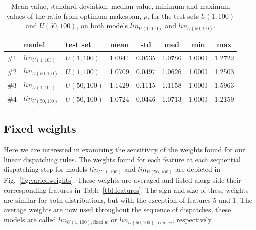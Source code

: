 \documentclass[10pt]{llncs}
\begin{document}
\begin{table}[t!]
 {\footnotesize
 \begin{center}
  \begin{tabular}{|c|l|l|ccccc|}
   \hline\hline
   & model & test set & mean & std    & med    & min    & max   \\ \hline
\#1 & $lin_{U(1,100)}$ & $U(1,100)$ & 1.0844 & 0.0535 & 1.0786 & 1.0000 & 1.2722  \\
\#2 & $lin_{U(50,100)}$ & $U(1,100)$ & 1.0709 & 0.0497&1.0626 & 1.0000 & 1.2503  \\
\#3 & $lin_{U(1,100)}$ & $U(50,100)$ & 1.1429 & 0.1115&1.1158 & 1.0000 & 1.5963  \\
\#4 & $lin_{U(50,100)}$ & $U(50,100)$ & 1.0724 & 0.0446&1.0713 & 1.0000 & 1.2159  \\
   \hline\hline
  \end{tabular}
 \end{center}}
 \caption{Mean value, standard deviation, median value, minimum and maximum values of the ratio from optimum makespan, $\rho$, for the test sets $U(1,100)$ and $U(50,100)$, on both models $lin_{U(1,100)}$ and $lin_{U(50,100)}$.}
 \label{tbl:diffdatadistr}
\end{table}

\subsection{Fixed weights}
Here we are interested in examining the sensitivity of the weights found for our linear dispatching rules. The weights found for each feature at each sequential dispatching step for models $lin_{U(1,100)}$ and $lin_{U(50,100)}$ are depicted in Fig.~\ref{fig:variedweights}. These weights are averaged and listed along side their corresponding features in Table~\ref{tbl:features}. The sign and size of these weights are similar for both distributions, but with the exception of features 5 and 1. The average weights are now used throughout the sequence of dispatches, these models are called $lin_{U(1,100),\textrm{fixed }w}$ or $lin_{U(50,100),\textrm{fixed }w}$, respectively.
\end{document}

